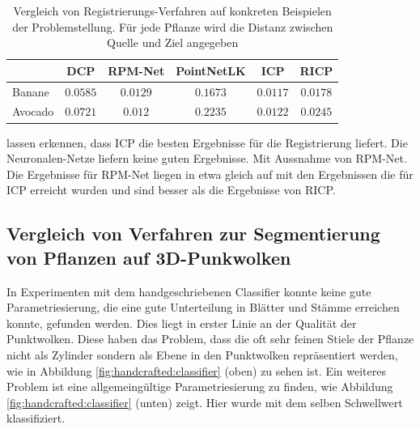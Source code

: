 \documentclass[12pt,titlepage, twoside]{article}
\begin{document}
\begin{table}
    \begin{center}
    \begin{tabular}{|l || c | c | c | c | c | } 
        \hline
         & DCP & RPM-Net & PointNetLK & ICP & RICP \\  
        \hline
        \hline
        Banane & $0.0585$ & $0.0129$& $0.1673$& $0.0117$& $0.0178$\\
        \hline
        Avocado & $0.0721$& $0.012$& $0.2235$& $0.0122$& $0.0245$\\
        \hline
    \end{tabular}
    \end{center}
    \caption{Vergleich von Registrierungs-Verfahren auf konkreten Beispielen der Problemstellung. Für jede Pflanze wird die Distanz zwischen Quelle und Ziel angegeben}
    \label{tab:registration:real:compare}
\end{table}

lassen erkennen, dass ICP die besten Ergebnisse für die Registrierung liefert. 
Die Neuronalen-Netze liefern keine guten Ergebnisse. Mit Aussnahme von RPM-Net. 
Die Ergebnisse für RPM-Net liegen in etwa gleich auf mit den Ergebnissen die für ICP erreicht wurden und sind besser als die Ergebnisse von RICP.

\subsection{Vergleich von Verfahren zur Segmentierung von Pflanzen auf 3D-Punkwolken}

In Experimenten mit dem handgeschriebenen Classifier konnte keine gute Parametriesierung, die eine gute Unterteilung in Blätter und Stämme erreichen konnte, gefunden werden. 
Dies liegt in erster Linie an der Qualität der Punktwolken.
Diese haben das Problem, dass die oft sehr feinen Stiele der Pflanze nicht als Zylinder sondern als Ebene in den Punktwolken repräsentiert werden, wie in Abbildung \ref{fig:handcrafted:classifier} (oben) zu sehen ist.
Ein weiteres Problem ist eine allgemeingültige Parametriesierung zu finden, wie Abbildung \ref{fig:handcrafted:classifier} (unten) zeigt. Hier wurde mit dem selben Schwellwert klassifiziert.
\end{document}
